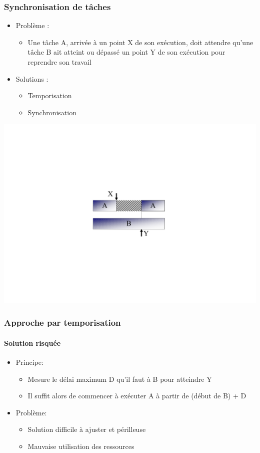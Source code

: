 \begin{frame}
\frametitle{Synchronisation de tâches}
\begin{itemize}
\item Problème :
\begin{itemize}
\item Une tâche A, arrivée à un point X de son exécution, doit attendre qu'une tâche B ait atteint ou dépassé un point Y de son exécution pour reprendre son travail
\end{itemize}
\item Solutions :
\begin{itemize}
\item Temporisation
\item Synchronisation
\end{itemize}
\end{itemize}
\begin{flushright}
\includegraphics[width=.4\textwidth]{../illustration/temporisation.pdf}
\end{flushright}
\end{frame}

\begin{frame}
\frametitle{Approche par temporisation}
\framesubtitle{Solution risquée}
\begin{itemize}
\item Principe:
\begin{itemize}
\item Mesure le délai maximum D qu'il faut à B pour atteindre Y
\item Il suffit alors de commencer à exécuter A à partir de (début de B) + D
\end{itemize}
\item Problème:
\begin{itemize}
\item Solution difficile à ajuster et périlleuse
\item Mauvaise utilisation des ressources
\end{itemize}
\end{itemize}
\end{frame}

